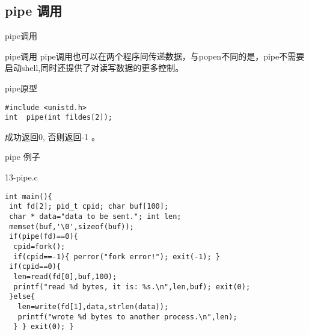 \documentclass{beamer}
\begin{document}
\subsection{pipe 调用}
\begin{frame}
\Huge{\centerline{pipe调用}}
\end{frame}
\begin{frame}[fragile]{pipe调用}
pipe调用也可以在两个程序间传递数据，与popen不同的是，pipe不需要启动shell,同时还提供了对读写数据的更多控制。
\begin{block}{pipe原型}
\begin{verbatim}
#include <unistd.h>
int  pipe(int fildes[2]);
\end{verbatim}
成功返回0, 否则返回-1 。
\end{block}

\end{frame}

\begin{frame}[fragile]{pipe 例子}
\begin{block}{13-pipe.c}
\begin{verbatim}
int main(){
 int fd[2]; pid_t cpid; char buf[100];
 char * data="data to be sent."; int len;
 memset(buf,'\0',sizeof(buf));
 if(pipe(fd)==0){
  cpid=fork();
  if(cpid==-1){ perror("fork error!"); exit(-1); }
 if(cpid==0){
  len=read(fd[0],buf,100);
  printf("read %d bytes, it is: %s.\n",len,buf); exit(0);	
 }else{
   len=write(fd[1],data,strlen(data));
   printf("wrote %d bytes to another process.\n",len);
  } } exit(0); }

\end{verbatim}
\end{block}
\end{frame}
\end{document}
